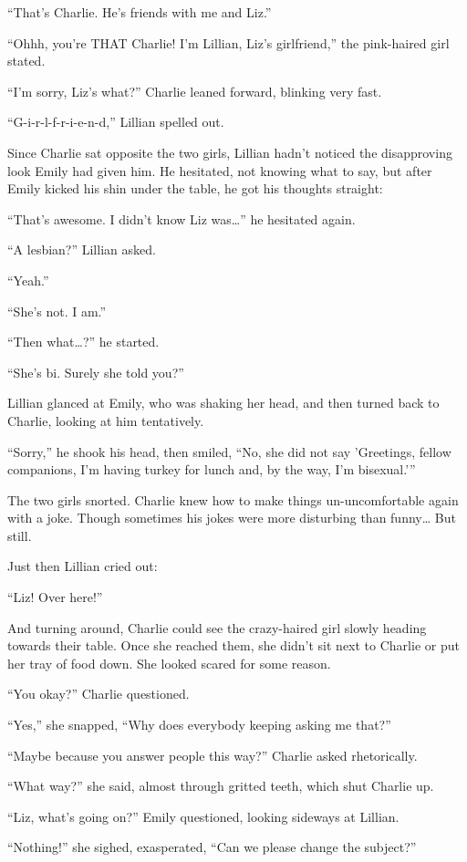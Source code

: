 “That's Charlie. He's friends with me and Liz.”

“Ohhh, you're THAT Charlie! I'm Lillian, Liz's girlfriend,” the pink-haired girl stated.

“I'm sorry, Liz's what?” Charlie leaned forward, blinking very fast.

“G-i-r-l-f-r-i-e-n-d,” Lillian spelled out.

Since Charlie sat opposite the two girls, Lillian hadn't noticed the disapproving look Emily had given him. He hesitated, not knowing what to say, but after Emily kicked his shin under the table, he got his thoughts straight:

“That's awesome. I didn't know Liz was…” he hesitated again.

“A lesbian?” Lillian asked.

“Yeah.”

“She's not. I am.”

“Then what…?” he started.

“She's bi. Surely she told you?”

Lillian glanced at Emily, who was shaking her head, and then turned back to Charlie, looking at him tentatively.

“Sorry,” he shook his head, then smiled, “No, she did not say 'Greetings, fellow companions, I'm having turkey for lunch and, by the way, I'm bisexual.'”

The two girls snorted. Charlie knew how to make things un-uncomfortable again with a joke. Though sometimes his jokes were more disturbing than funny…  But still.

Just then Lillian cried out:

“Liz! Over here!”

And turning around, Charlie could see the crazy-haired girl slowly heading towards their table. Once she reached them, she didn't sit next to Charlie or put her tray of food down. She looked scared for some reason.

“You okay?” Charlie questioned.

“Yes,” she snapped, “Why does everybody keeping asking me that?”

“Maybe because you answer people this way?” Charlie asked rhetorically.

“What way?” she said, almost through gritted teeth, which shut Charlie up.

“Liz, what's going on?” Emily questioned, looking sideways at Lillian.

“Nothing!” she sighed, exasperated, “Can we please change the subject?”

